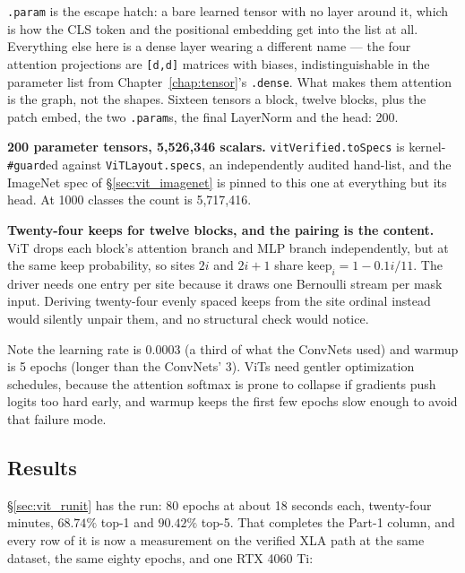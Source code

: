 \noindent \texttt{.param} is the escape hatch: a bare learned tensor with
no layer around it, which is how the CLS token and the positional
embedding get into the list at all. Everything else here is a dense
layer wearing a different name --- the four attention projections are
\texttt{[d,d]} matrices with biases, indistinguishable in the parameter
list from Chapter~\ref{chap:tensor}'s \texttt{.dense}. What makes them
attention is the graph, not the shapes. Sixteen tensors a block,
twelve blocks, plus the patch embed, the two \texttt{.param}s, the final
LayerNorm and the head: 200.

\textbf{200 parameter tensors, 5,526,346 scalars.}
\texttt{vitVerified.toSpecs} is kernel-\texttt{\#guard}ed against
\texttt{ViTLayout.specs}, an independently audited hand-list, and the
ImageNet spec of \S\ref{sec:vit_imagenet} is pinned to this one at
everything but its head. At 1000 classes the count is 5,717,416.

\textbf{Twenty-four keeps for twelve blocks, and the pairing is the
content.} ViT drops each block's attention branch and MLP branch
independently, but at the same keep probability, so sites $2i$ and
$2i+1$ share $\mathrm{keep}_i = 1 - 0.1i/11$. The driver needs one
entry per site because it draws one Bernoulli stream per mask
input. Deriving twenty-four evenly spaced keeps from the site ordinal
instead would silently unpair them, and no structural check would
notice.

Note the learning rate is 0.0003 (a third of what the ConvNets
used) and warmup is 5 epochs (longer than the ConvNets' 3). ViTs
need gentler optimization schedules, because the attention
softmax is prone to collapse if gradients push logits too hard
early, and warmup keeps the first few epochs slow enough to avoid
that failure mode.

\subsection*{Results}
\label{sec:vit_results}

\S\ref{sec:vit_runit} has the run: 80 epochs at about 18 seconds each,
twenty-four minutes, $\mathbf{68.74\%}$ top-1 and $\mathbf{90.42\%}$
top-5. That completes the Part-1 column, and every row of it is now a
measurement on the verified XLA path at the same dataset, the same
eighty epochs, and one RTX 4060 Ti:


